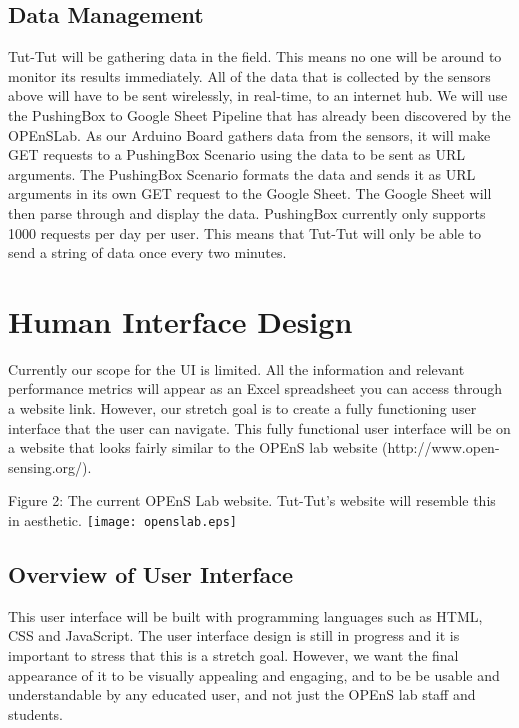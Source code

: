 \documentclass[letterpaper,10pt,draftclsnofoot,onecolumn]{article}
\begin{document}
\subsection{Data Management}
Tut-Tut will be gathering data in the field. This means no one will be around to monitor its results immediately. All of the data that is collected by the sensors above will have to be sent wirelessly, in real-time, to an internet hub. We will use the PushingBox to Google Sheet Pipeline that has already been discovered by the OPEnSLab.\cite{PushingBox} As our Arduino Board gathers data from the sensors, it will make GET requests to a PushingBox Scenario using the data to be sent as URL arguments. The PushingBox Scenario formats the data and sends it as URL arguments in its own GET request to the Google Sheet. The Google Sheet will then parse through and display the data. PushingBox currently only supports 1000 requests per day per user. This means that Tut-Tut will only be able to send a string of data once every two minutes.

\section{Human Interface Design}
Currently our scope for the UI is limited. All the information and relevant performance metrics will appear as an Excel spreadsheet you can access through a website link. However, our stretch goal is to create a fully functioning user interface that the user can navigate. This fully functional user interface will be on a website that looks fairly similar to the OPEnS lab website (http://www.open-sensing.org/). 
\newline

\begin{center}
Figure 2: The current OPEnS Lab website. Tut-Tut's website will resemble this in aesthetic.\cite{OPEnSLab}
\texttt{[image: openslab.eps]}
\end{center}

\subsection{Overview of User Interface}
This user interface will be built with programming languages such as HTML, CSS and JavaScript. The user interface design is still in progress and it is important to stress that this is a stretch goal. However, we want the final appearance of it to be visually appealing and engaging, and to be be usable and understandable by any educated user, and not just the OPEnS lab staff and students.
\end{document}

